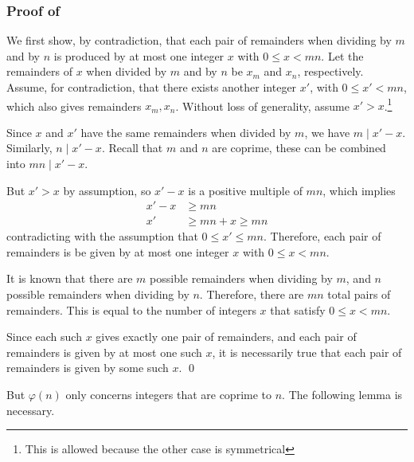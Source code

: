 \documentclass[a4paper, 12pt]{article}
\theoremstyle{definition}
\begin{document}
\subsubsection*{Proof of }
We first show, by contradiction, that each pair of remainders when dividing by $m$ and by $n$ is produced by at most one integer $x$ with $0 \leq x < mn$.
Let the remainders of $x$ when divided by $m$ and by $n$ be $x_m$ and $x_n$, respectively.
Assume, for contradiction, that there exists another integer $x'$, with $0 \leq x' < mn$, which also gives remainders $x_m, x_n$.
Without loss of generality, assume $x' > x$.\footnote{This is allowed because the other case is symmetrical}

Since $x$ and $x'$ have the same remainders when divided by $m$, we have $m \mid x' - x$.
Similarly, $n \mid x' - x$.
Recall that $m$ and $n$ are coprime, these can be combined into $mn \mid x'-x$.

But $x'>x$ by assumption, so $x'-x$ is a positive multiple of $mn$, which implies
\begin{align}
  x'-x &\geq mn\\
  x'   &\geq mn + x \geq mn
\end{align}
contradicting with the assumption that $0 \leq x' \leq mn$.
Therefore, each pair of remainders is be given by at most one integer $x$ with $0\leq x < mn$.

It is known that there are $m$ possible remainders when dividing by $m$, and $n$ possible remainders when dividing by $n$.
Therefore, there are $mn$ total pairs of remainders.
This is equal to the number of integers $x$ that satisfy $0\leq x < mn$.

Since each such $x$ gives exactly one pair of remainders,
and each pair of remainders is given by at most one such $x$,
it is necessarily true that each pair of remainders is given by some such $x$.
\qed\vspace{1em}

But $\varphi(n)$ only concerns integers that are coprime to $n$.
The following lemma is necessary.
\end{document}
